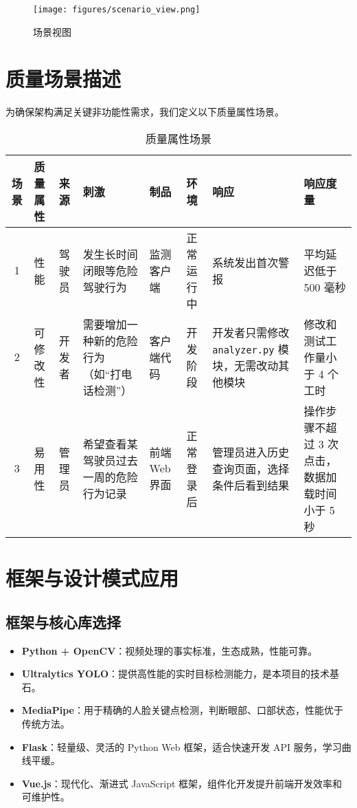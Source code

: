 \documentclass[a4paper,12pt]{article}
\begin{document}
\begin{figure}[h]
  \centering
  \texttt{[image: figures/scenario\_view.png]}
  \caption{场景视图}
  \label{fig:scenario_view}
\end{figure}

\section{质量场景描述}
为确保架构满足关键非功能性需求，我们定义以下质量属性场景。

\begin{table}[H]
  \centering
  \small %
  \caption{质量属性场景}
  \label{tab:quality_scenarios}
  \begin{tabularx}{\textwidth}{|c|X|X|X|X|X|X|X|} %
    \hline
    \textbf{场景} & \textbf{质量属性} & \textbf{来源} & \textbf{刺激} & \textbf{制品} & \textbf{环境} & \textbf{响应} & \textbf{响应度量} \\
    \hline
    1 & 性能 & 驾驶员 & 发生长时间闭眼等危险驾驶行为 & 监测客户端 & 正常运行中 & 系统发出首次警报 & 平均延迟低于 500 毫秒 \\
    \hline
    2 & 可修改性 & 开发者 & 需要增加一种新的危险行为（如“打电话检测”） & 客户端代码 & 开发阶段 & 开发者只需修改 \texttt{analyzer.py} 模块，无需改动其他模块 & 修改和测试工作量小于 4 个工时 \\
    \hline
    3 & 易用性 & 管理员 & 希望查看某驾驶员过去一周的危险行为记录 & 前端 Web 界面 & 正常登录后 & 管理员进入历史查询页面，选择条件后看到结果 & 操作步骤不超过 3 次点击，数据加载时间小于 5 秒 \\
    \hline
  \end{tabularx}
\end{table}

\section{框架与设计模式应用}
\subsection{框架与核心库选择}
\begin{itemize}
  \item \textbf{Python + OpenCV}：视频处理的事实标准，生态成熟，性能可靠。
  \item \textbf{Ultralytics YOLO}：提供高性能的实时目标检测能力，是本项目的技术基石。
  \item \textbf{MediaPipe}：用于精确的人脸关键点检测，判断眼部、口部状态，性能优于传统方法。
  \item \textbf{Flask}：轻量级、灵活的 Python Web 框架，适合快速开发 API 服务，学习曲线平缓。
  \item \textbf{Vue.js}：现代化、渐进式 JavaScript 框架，组件化开发提升前端开发效率和可维护性。
\end{itemize}
\end{document}
